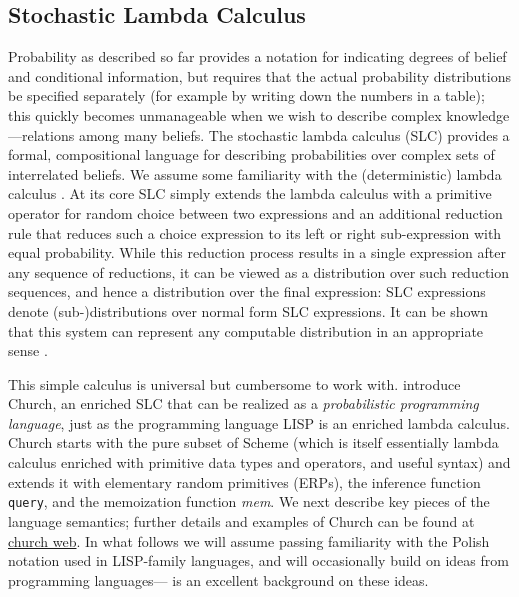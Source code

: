\documentclass[12pt]{article}
\begin{document}
\subsection{Stochastic Lambda Calculus}

Probability as described so far provides a notation for indicating degrees of belief and conditional information, but requires that the actual probability distributions be specified separately (for example by writing down the numbers in a table); this quickly becomes unmanageable when we wish to describe complex knowledge---relations among many beliefs. 
The stochastic lambda calculus (SLC) provides a formal, compositional language for describing probabilities over complex sets of interrelated beliefs. 
We assume some familiarity with the (deterministic) lambda calculus \cite{lambda}. 
At its core SLC simply extends the lambda calculus with a primitive operator for random choice between two expressions and an additional reduction rule that reduces such a choice expression to its left or right sub-expression with equal probability. 
While this reduction process results in a single expression after any sequence of reductions, it can be viewed as a distribution over such reduction sequences, and hence a distribution over the final expression: SLC expressions denote (sub-)distributions over normal form SLC expressions. 
It can be shown that this system can represent any computable distribution in an appropriate sense \cite[see for example][]{PfefferRamsey,FreeRoy}.

This simple calculus is universal but cumbersome to work with. 
\cite{Goodman} introduce Church, an enriched SLC that can be realized as a \emph{probabilistic programming language}, just as the programming language LISP is an enriched lambda calculus. Church starts with the pure subset of Scheme (which is itself essentially lambda calculus enriched with primitive data types and operators, and useful syntax) and extends it with elementary random primitives (ERPs), the inference function \lstinline{query}, and the memoization function \emph{mem}. 
We next describe key pieces of the language semantics; further details and examples of Church can be found at \url{church web}.
In what follows we will assume passing familiarity with the Polish notation used in LISP-family languages, and will occasionally build on ideas from programming languages---\cite{SICP} is an excellent background on these ideas. 
\end{document}
